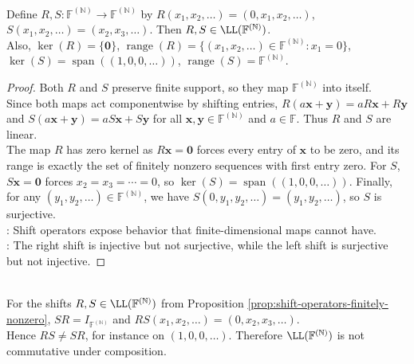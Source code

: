\begin{proposition} \label{prop:shift-operators-finitely-nonzero} \\
Define $R,S:\mathbb{F}^{(\mathbb{N})}\to\mathbb{F}^{(\mathbb{N})}$ by $R(x_1,x_2,\ldots)=(0,x_1,x_2,\ldots)$, $S(x_1,x_2,\ldots)=(x_2,x_3,\ldots)$. Then $R,S\in\LL(\mathbb{F}^{(\mathbb{N})})$.\\
Also, $\ker(R)=\{\mathbf{0}\}$, $\operatorname{range}(R)=\{(x_1,x_2,\ldots)\in\mathbb{F}^{(\mathbb{N})}:x_1=0\}$, $\ker(S)=\operatorname{span}((1,0,0,\ldots))$, $\operatorname{range}(S)=\mathbb{F}^{(\mathbb{N})}$.
\begin{proof}
Both $R$ and $S$ preserve finite support, so they map $\mathbb{F}^{(\mathbb{N})}$ into itself.\\
Since both maps act componentwise by shifting entries, $R(a\mathbf{x}+\mathbf{y})=aR\mathbf{x}+R\mathbf{y}$ and $S(a\mathbf{x}+\mathbf{y})=aS\mathbf{x}+S\mathbf{y}$ for all $\mathbf{x},\mathbf{y}\in\mathbb{F}^{(\mathbb{N})}$ and $a\in\mathbb{F}$. Thus $R$ and $S$ are linear.\\
The map $R$ has zero kernel as $R\mathbf{x}=\mathbf{0}$ forces every entry of $\mathbf{x}$ to be zero, and its range is exactly the set of finitely nonzero sequences with first entry zero. For $S$, $S\mathbf{x}=\mathbf{0}$ forces $x_2=x_3=\cdots=0$, so $\ker(S)=\operatorname{span}((1,0,0,\ldots))$. Finally, for any $(y_1,y_2,\ldots)\in\mathbb{F}^{(\mathbb{N})}$, we have $S(0,y_1,y_2,\ldots)=(y_1,y_2,\ldots)$, so $S$ is surjective.\\
: Shift operators expose behavior that finite-dimensional maps cannot have.\\
: The right shift is injective but not surjective, while the left shift is surjective but not injective.
\end{proof}
\end{proposition}

\begin{example} \label{ex:shift-operators-show-operator-algebra-noncommutative} \\
For the shifts $R,S\in\LL(\mathbb{F}^{(\mathbb{N})})$ from Proposition \ref{prop:shift-operators-finitely-nonzero}, $SR=I_{\mathbb{F}^{(\mathbb{N})}}$ and $RS(x_1,x_2,\ldots)=(0,x_2,x_3,\ldots)$.\\
Hence $RS\neq SR$, for instance on $(1,0,0,\ldots)$. Therefore $\LL(\mathbb{F}^{(\mathbb{N})})$ is not commutative under composition.
\end{example}

